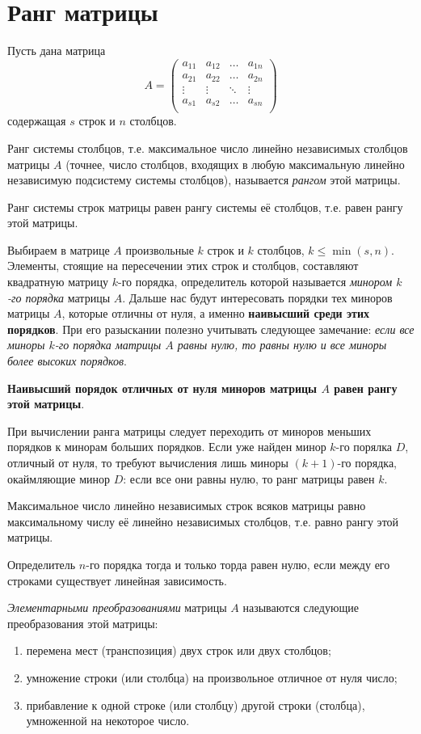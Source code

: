 \documentclass{article}
\begin{document}
\section*{Ранг матрицы}
Пусть дана матрица
\[
A =
\left(
\begin{matrix}
    a_{11} & a_{12} & \hdots & a_{1n} \\
    a_{21} & a_{22} & \hdots & a_{2n} \\
    \vdots & \vdots & \ddots & \vdots \\
    a_{s1} & a_{s2} & \hdots & a_{sn} \\
\end{matrix}  
\right)  
\]
содержащая $s$ строк и $n$ столбцов.

Ранг системы столбцов, т.е. максимальное число линейно независимых столбцов
матрицы $A$ (точнее, число столбцов, входящих в любую максимальную линейно
независимую подсистему системы столбцов), называется \textit{рангом} этой матрицы.

Ранг системы строк матрицы равен рангу системы её столбцов, т.е. равен рангу этой матрицы.

Выбираем в матрице $A$ произвольные $k$ строк и $k$ столбцов, $k \le \min(s, n)$.
Элементы, стоящие на пересечении этих строк и столбцов, составляют квадратную
матрицу $k$-го порядка, определитель которой называется \textit{минором $k$-го порядка}
матрицы $A$. Дальше нас будут интересовать порядки тех миноров матрицы $A$, которые
отличны от нуля, а именно \textbf{наивысший среди этих порядков}. При его разыскании
полезно учитывать следующее замечание: \textit{если все миноры $k$-го порядка матрицы
$A$ равны нулю, то равны нулю и все миноры более высоких порядков}.

\textbf{Наивысший порядок отличных от нуля миноров матрицы $A$ равен рангу этой матрицы}.

При вычислении ранга матрицы следует переходить от миноров меньших порядков к минорам
больших порядков. Если уже найден минор $k$-го порялка $D$, отличный от нуля, то
требуют вычисления лишь миноры $(k + 1)$-го порядка, окаймляющие минор $D$:
если все они равны нулю, то ранг матрицы равен $k$.

Максимальное число линейно независимых строк всяков матрицы равно максимальному числу
её линейно независимых столбцов, т.е. равно рангу этой матрицы.

Определитель $n$-го порядка тогда и только торда равен нулю, если между его строками
существует линейная зависимость.

\textit{Элементарными преобразованиями} матрицы $A$ называются следующие 
преобразования этой матрицы:
\begin{enumerate}
    \item перемена мест (транспозиция) двух строк или двух столбцов;
    \item умножение строки (или столбца) на произвольное отличное от нуля число;
    \item прибавление к одной строке (или столбцу) другой строки (столбца),
    умноженной на некоторое число.
\end{enumerate}
\end{document}
